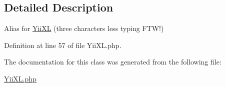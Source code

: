 \subsection{Detailed Description}
Alias for \hyperlink{classYiiXL}{YiiXL} (three characters less typing FTW!) 

Definition at line 57 of file YiiXL.php.



The documentation for this class was generated from the following file:\begin{DoxyCompactItemize}
\item 
\hyperlink{YiiXL_8php}{YiiXL.php}\end{DoxyCompactItemize}

